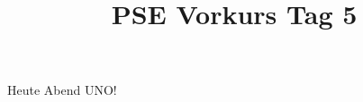 \documentclass{../../sheet}
\title{PSE Vorkurs Tag 5}
\begin{document}
\maketitle
Heute Abend UNO!

\newpage

\end{document}
